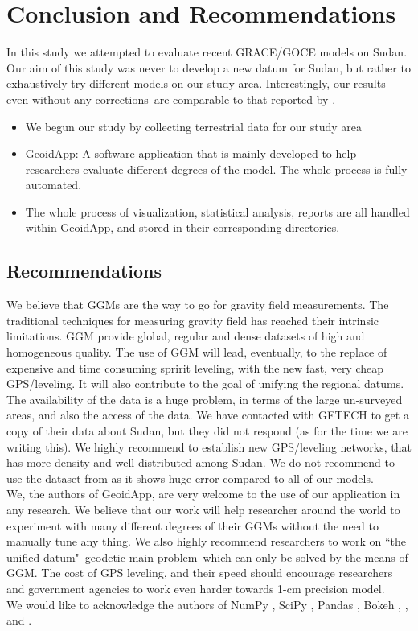 \chapter{Conclusion and Recommendations}
\label{Chapter6}

In this study we attempted to evaluate recent GRACE/GOCE models on Sudan. Our aim of this study was never to develop a new datum for Sudan, but rather to exhaustively try different models on our study area. Interestingly, our results--even without any corrections--are comparable to that reported by \citep{ahmed_msc, godah}. 

\begin{itemize}
	\item We begun our study by collecting terrestrial data for our study area
	\item GeoidApp: A software application that is mainly developed to help researchers evaluate different degrees of the model. The whole process is fully automated.
	\item The whole process of visualization, statistical analysis, reports are all handled within GeoidApp, and stored in their corresponding directories.
\end{itemize}

\section{Recommendations}

We believe that GGMs are the way to go for gravity field measurements. The traditional techniques for measuring gravity field has reached their intrinsic limitations. GGM provide global, regular and dense datasets of high and homogeneous quality. The use of GGM will lead, eventually, to the replace of expensive and time consuming spririt leveling, with the new fast, very cheap GPS/leveling. It will also contribute to the goal of unifying the regional datums.
\\
The availability of the data is a huge problem, in terms of the large un-surveyed areas, and also the access of the data. We have contacted with GETECH to get a copy of their data about Sudan, but they did not respond (as for the time we are writing this). We highly recommend to establish new GPS/leveling networks, that has more density and well distributed among Sudan. We do not recommend to use the dataset from \citep{osman} as it shows huge error compared to all of our models. 
\\
We, the authors of GeoidApp, are very welcome to the use of our application in any research. We believe that our work will help researcher around the world to experiment with many different degrees of their GGMs without the need to manually tune any thing. We also highly recommend researchers to work on ``the unified datum"--geodetic main problem--which can only be solved by the means of GGM. The cost of GPS leveling, and their speed should encourage researchers and government agencies to work even harder towards 1-cm precision model.
\\
We would like to acknowledge the authors of NumPy \cite{numpy}, SciPy \cite{scipy}, Pandas \cite{pandas}, Bokeh \cite{bokeh}, \cite{octave}, and \cite{ipython}.